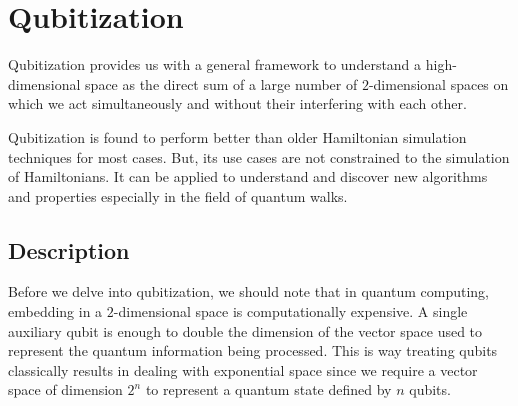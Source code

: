 \documentclass[
10pt, %
a4paper, %
oneside, %
headinclude,footinclude, %
BCOR5mm, %
]{scrartcl}
\begin{document}

\section{Qubitization}
Qubitization provides us with a general framework to understand a high-dimensional space as the direct sum of a large number of $2$-dimensional spaces on which we act simultaneously and without their interfering with each other.\newline

Qubitization is found to perform better than older Hamiltonian simulation techniques for most cases. But, its use cases are not constrained to the simulation of Hamiltonians. It can be applied to understand and discover new algorithms and properties especially in the field of quantum walks.\newline

\subsection{Description}
Before we delve into qubitization, we should note that in quantum computing, embedding in a $2$-dimensional space is computationally expensive. A single auxiliary qubit is enough to double the dimension of the vector space used to represent the quantum information being processed. This is way treating qubits classically results in dealing with exponential space since we require a vector space of dimension $2^n$ to represent a quantum state defined by $n$ qubits.\newline
\end{document}
